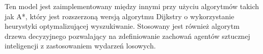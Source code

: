 Ten model jest zaimplementowany między innymi przy użyciu algorytmów takich jak A*, który jest rozszerzoną wersją algorytmu Dijkstry o wykorzystanie heurystyki
optymalizującej wyszukiwanie. Stosowany jest również algorytm drzewa decyzyjnego pozwalający na zdefiniowanie zachowań agentów sztucznej inteligencji z zastosowaniem wydarzeń losowych.
